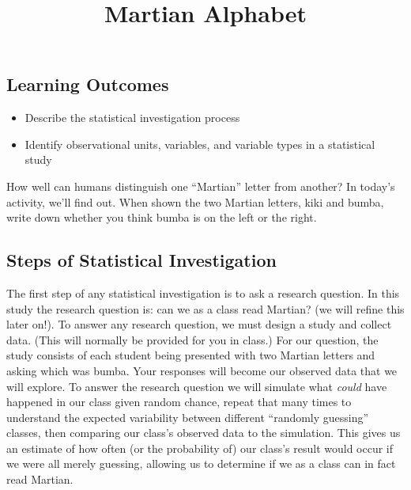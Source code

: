 \documentclass[
]{article}
\title{Martian Alphabet}
\author{}
\date{\vspace{-2.5em}}
\begin{document}
\maketitle

\hypertarget{learning-outcomes}{%
\subsection{Learning Outcomes}\label{learning-outcomes}}

\begin{itemize}
\item
  Describe the statistical investigation process
\item
  Identify observational units, variables, and variable types in a
  statistical study
\end{itemize}

How well can humans distinguish one ``Martian'' letter from another? In
today's activity, we'll find out. When shown the two Martian letters,
kiki and bumba, write down whether you think bumba is on the left or the
right.

\vspace{0.5in}

\hypertarget{steps-of-statistical-investigation}{%
\subsection{Steps of Statistical
Investigation}\label{steps-of-statistical-investigation}}

The first step of any statistical investigation is to ask a research
question. In this study the research question is: can we as a class read
Martian? (we will refine this later on!). To answer any research
question, we must design a study and collect data. (This will normally
be provided for you in class.) For our question, the study consists of
each student being presented with two Martian letters and asking which
was bumba. Your responses will become our observed data that we will
explore. To answer the research question we will simulate what
\emph{could} have happened in our class given random chance, repeat that
many times to understand the expected variability between different
``randomly guessing'' classes, then comparing our class's observed data
to the simulation. This gives us an estimate of how often (or the
probability of) our class's result would occur if we were all merely
guessing, allowing us to determine if we as a class can in fact read
Martian.
\end{document}
